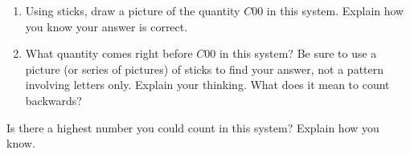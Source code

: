 \documentclass{ximera}
\begin{document}
\begin{problem}
\begin{enumerate}
	\item Using sticks, draw a picture of the quantity $C00$ in this system. Explain how you know your answer is correct.
	\item What quantity comes right before $C00$ in this system? Be sure to use a picture (or series of pictures) of sticks to find your answer, not a pattern involving letters only. Explain your thinking. What does it mean to count backwards?
\end{enumerate}
\end{problem}


\begin{problem}
Is there a highest number you could count in this system? Explain how you know. 
\end{problem}


\end{document}
